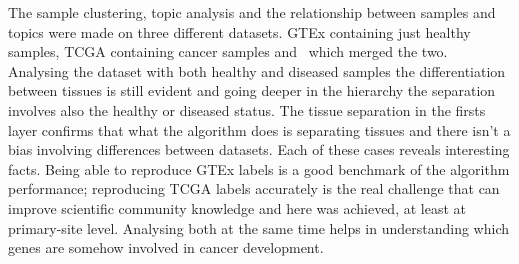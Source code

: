 The sample clustering, topic analysis and the relationship between samples and topics were made on three different datasets. GTEx containing just healthy samples, TCGA containing cancer samples and~\cite{Wang2017} which merged the two. Analysing the dataset with both healthy and diseased samples the differentiation between tissues is still evident and going deeper in the hierarchy the separation involves also the healthy or diseased status. The tissue separation in the firsts layer confirms that what the algorithm does is separating tissues and there isn't a bias involving differences between datasets.
\clearpage
Each of these cases reveals interesting facts. Being able to reproduce GTEx labels is a good benchmark of the algorithm performance; reproducing TCGA labels accurately is the real challenge that can improve scientific community knowledge and here was achieved, at least at primary-site level. Analysing both at the same time helps in understanding which genes are somehow involved in cancer development.